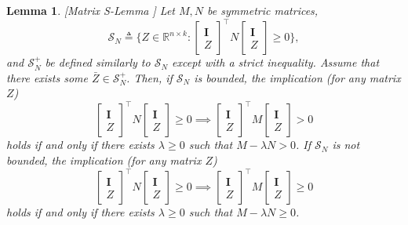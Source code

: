 \documentclass[letterpaper, 10 pt, conference]{ieeeconf}%
\newcommand{\R}{\mathbb{R}}
\newcommand{\T}{\top}
\newcommand{\I}{\mathbf{I}}
\newcommand{\0}{\mathbf{0}}
\newcommand{\bm}[1]{\begin{bmatrix}#1\end{bmatrix}}
\newtheorem{lemma}{\textbf{Lemma}}
\begin{document}
\begin{lemma}\label{Lm:MatrixSLemma} [Matrix S-Lemma \cite{van2020noisy}]
Let $M, N$ be symmetric matrices, 
$$\mathcal{S}_N \triangleq \{ Z\in\R^{n \times k} : \bm{\I \\ Z}^\T N \bm{\I \\ Z} \geq 0\},$$
and $\mathcal{S}_N^+$ be defined similarly to $\mathcal{S}_N$ except with a strict inequality. Assume that there exists some $\bar{Z} \in \mathcal{S}_N^+$. Then, if $\mathcal{S}_N$ is bounded, the implication (for any matrix $Z$)
$$
\bm{\I \\ Z}^\T N \bm{\I \\ Z} \geq 0 \implies \bm{\I \\ Z}^\T M \bm{\I \\ Z} > 0
$$
holds if and only if there exists $\lambda \geq 0$ such that $M - \lambda N > 0$. If $\mathcal{S}_N$ is not bounded, 
the implication (for any matrix $Z$)
$$
\bm{\I \\ Z}^\T N \bm{\I \\ Z} \geq 0 \implies \bm{\I \\ Z}^\T M \bm{\I \\ Z} \geq 0
$$
holds if and only if there exists $\lambda \geq 0$ such that $M - \lambda N \geq 0$.
\end{lemma}



\end{document}
